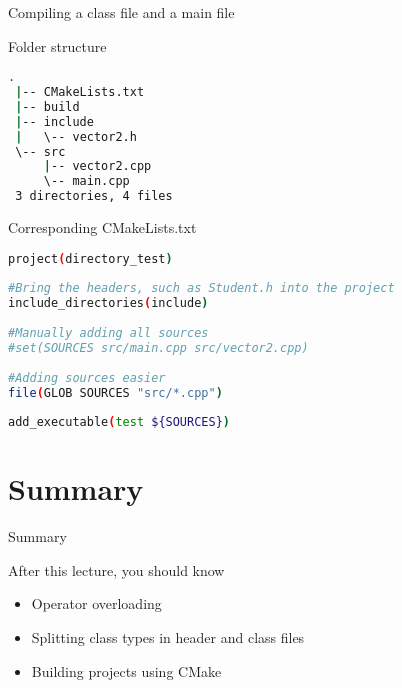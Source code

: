 \documentclass[\classoption]{beamer}
\begin{document}
\begin{frame}[fragile]{Compiling a class file and a main file}

\begin{block}{Folder structure}
\begin{lstlisting}[language=bash]
 .
 |-- CMakeLists.txt
 |-- build
 |-- include
 |   \-- vector2.h
 \-- src
     |-- vector2.cpp
     \-- main.cpp
 3 directories, 4 files
\end{lstlisting}
\end{block}

\end{frame}


\begin{frame}[fragile]{Corresponding CMakeLists.txt}
\begin{lstlisting}[language=bash]
project(directory_test)
 
#Bring the headers, such as Student.h into the project
include_directories(include)
 
#Manually adding all sources 
#set(SOURCES src/main.cpp src/vector2.cpp)
 
#Adding sources easier
file(GLOB SOURCES "src/*.cpp")
 
add_executable(test ${SOURCES})
\end{lstlisting}
\end{frame}

\section{Summary}

\begin{frame}{Summary}
\begin{block}{After this lecture, you should know}
\begin{itemize}
\item Operator overloading
\item Splitting class types in header and class files
\item Building projects using CMake
\end{itemize}
\end{block}
\end{frame}
\end{document}

